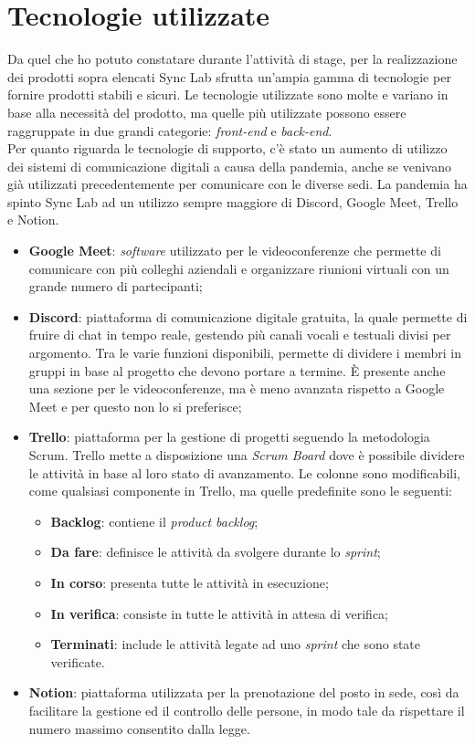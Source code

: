 \section{Tecnologie utilizzate}
Da quel che ho potuto constatare durante l'attività di stage, per la realizzazione dei prodotti sopra elencati Sync Lab sfrutta un'ampia gamma di tecnologie per fornire prodotti stabili e sicuri. Le tecnologie utilizzate sono molte e variano in base alla necessità del prodotto, ma quelle più utilizzate possono essere raggruppate in due grandi categorie: \textit{front-end} e \textit{back-end}. \\

Per quanto riguarda le tecnologie di supporto, c'è stato un aumento di utilizzo dei sistemi di comunicazione digitali a causa della pandemia, anche se venivano già utilizzati precedentemente per comunicare con le diverse sedi. La pandemia ha spinto Sync Lab ad un utilizzo sempre maggiore di Discord, Google Meet, Trello e Notion.

\begin{itemize}
  \item \textbf{Google Meet}: \textit{software} utilizzato per le videoconferenze che permette di comunicare con più colleghi aziendali e organizzare riunioni virtuali con un grande numero di partecipanti;
  \item \textbf{Discord}: piattaforma di comunicazione digitale gratuita, la quale permette di fruire di chat in tempo reale, gestendo più canali vocali e testuali divisi per argomento. Tra le varie funzioni disponibili, permette di dividere i membri in gruppi in base al progetto che devono portare a termine. È presente anche una sezione per le videoconferenze, ma è meno avanzata rispetto a Google Meet e per questo non lo si preferisce;
  \item \textbf{Trello}: piattaforma per la gestione di progetti seguendo la metodologia Scrum. Trello mette a disposizione una \textit{Scrum Board} dove è possibile dividere le attività in base al loro stato di avanzamento. Le colonne sono modificabili, come qualsiasi componente in Trello, ma quelle predefinite sono le seguenti:
  \begin{itemize}
    \item \textbf{Backlog}: contiene il \textit{product backlog};
    \item \textbf{Da fare}: definisce le attività da svolgere durante lo \textit{sprint};
    \item \textbf{In corso}: presenta tutte le attività in esecuzione;
    \item \textbf{In verifica}: consiste in tutte le attività in attesa di verifica;
    \item \textbf{Terminati}: include le attività legate ad uno \textit{sprint} che sono state verificate. 
  \end{itemize}
  \item \textbf{Notion}: piattaforma utilizzata per la prenotazione del posto in sede, così da facilitare la gestione ed il controllo delle persone, in modo tale da rispettare il numero massimo consentito dalla legge.
\end{itemize}

